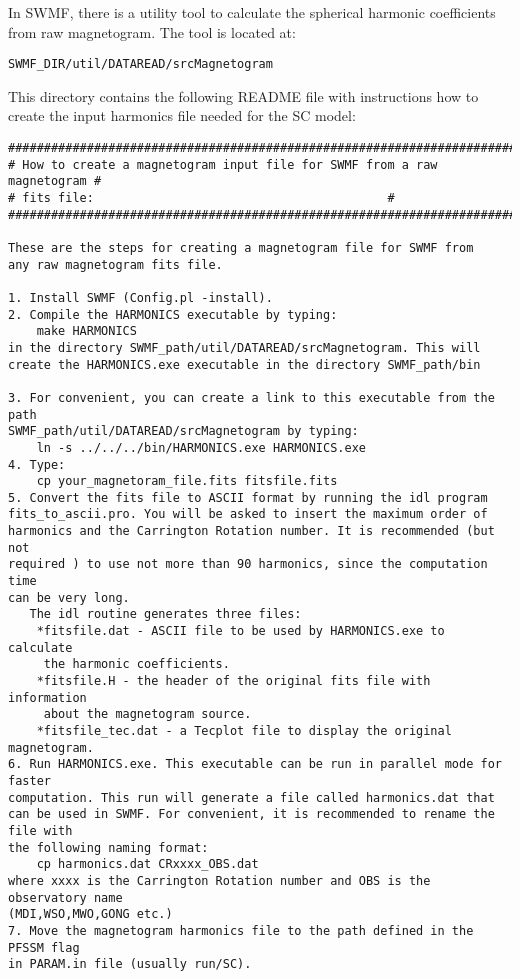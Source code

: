 In SWMF, there is a utility tool to calculate the spherical harmonic 
coefficients from raw magnetogram. The tool is located at: 
\begin{verbatim}
SWMF_DIR/util/DATAREAD/srcMagnetogram
\end{verbatim}
This directory contains the following README file with instructions how 
to create the input harmonics file needed for the SC model:
\begin{verbatim}
##########################################################################
# How to create a magnetogram input file for SWMF from a raw magnetogram #
# fits file:                						 #
##########################################################################

These are the steps for creating a magnetogram file for SWMF from 
any raw magnetogram fits file.

1. Install SWMF (Config.pl -install).
2. Compile the HARMONICS executable by typing:
	make HARMONICS
in the directory SWMF_path/util/DATAREAD/srcMagnetogram. This will 
create the HARMONICS.exe executable in the directory SWMF_path/bin

3. For convenient, you can create a link to this executable from the path
SWMF_path/util/DATAREAD/srcMagnetogram by typing:
	ln -s ../../../bin/HARMONICS.exe HARMONICS.exe
4. Type:
	cp your_magnetoram_file.fits fitsfile.fits
5. Convert the fits file to ASCII format by running the idl program 
fits_to_ascii.pro. You will be asked to insert the maximum order of 
harmonics and the Carrington Rotation number. It is recommended (but not 
required ) to use not more than 90 harmonics, since the computation time 
can be very long. 
   The idl routine generates three files:
	*fitsfile.dat - ASCII file to be used by HARMONICS.exe to calculate 
	 the harmonic coefficients.
	*fitsfile.H - the header of the original fits file with information 
	 about the magnetogram source.
	*fitsfile_tec.dat - a Tecplot file to display the original magnetogram.
6. Run HARMONICS.exe. This executable can be run in parallel mode for faster 
computation. This run will generate a file called harmonics.dat that 
can be used in SWMF. For convenient, it is recommended to rename the file with 
the following naming format:
	cp harmonics.dat CRxxxx_OBS.dat
where xxxx is the Carrington Rotation number and OBS is the observatory name 
(MDI,WSO,MWO,GONG etc.)
7. Move the magnetogram harmonics file to the path defined in the PFSSM flag 
in PARAM.in file (usually run/SC).
\end{verbatim}

